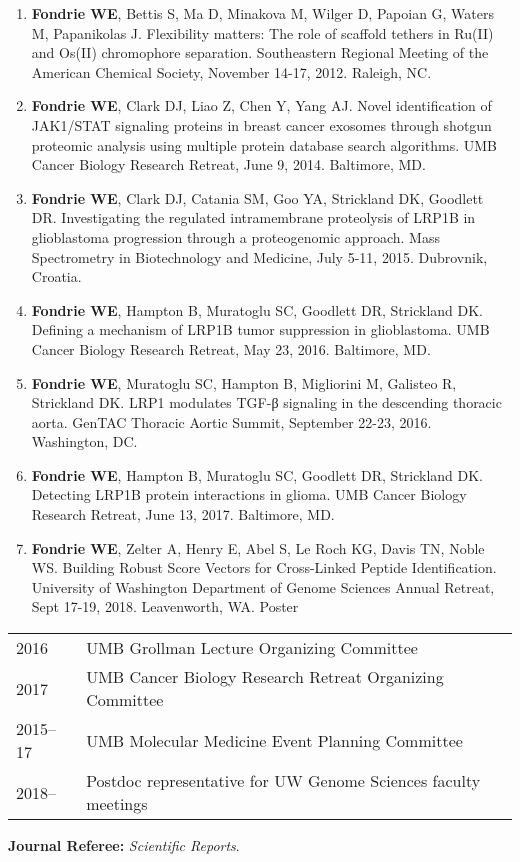 \documentclass{article}
\newcommand{\mysection}[1]{\vspace{1ex}{\bf #1}}
\begin{document}
\mysection{Poster Presentations}

\begin{enumerate}
  \item {\bf Fondrie WE}, Bettis S, Ma D, Minakova M, Wilger D, Papoian G, Waters M, Papanikolas J. Flexibility matters: The role of scaffold tethers in Ru(II) and Os(II) chromophore separation. Southeastern Regional Meeting of the American Chemical Society, November 14-17, 2012. Raleigh, NC.

  \item {\bf Fondrie WE}, Clark DJ, Liao Z, Chen Y, Yang AJ. Novel identification of JAK1/STAT signaling proteins in breast cancer exosomes through shotgun proteomic analysis using multiple protein database search algorithms. UMB Cancer Biology Research Retreat, June 9, 2014. Baltimore, MD.

  \item {\bf Fondrie WE}, Clark DJ, Catania SM, Goo YA, Strickland DK, Goodlett DR. Investigating the regulated intramembrane proteolysis of LRP1B in glioblastoma progression through a proteogenomic approach. Mass Spectrometry in Biotechnology and Medicine, July 5-11, 2015. Dubrovnik, Croatia.

  \item {\bf Fondrie WE}, Hampton B, Muratoglu SC, Goodlett DR, Strickland DK. Defining a mechanism of LRP1B tumor suppression in glioblastoma. UMB Cancer Biology Research Retreat, May 23, 2016. Baltimore, MD.

  \item {\bf Fondrie WE}, Muratoglu SC, Hampton B, Migliorini M, Galisteo R, Strickland DK. LRP1 modulates TGF-β signaling in the descending thoracic aorta. GenTAC Thoracic Aortic Summit, September 22-23, 2016. Washington, DC.

  \item {\bf Fondrie WE}, Hampton B, Muratoglu SC, Goodlett DR, Strickland DK. Detecting LRP1B protein interactions in glioma. UMB Cancer Biology Research Retreat, June 13, 2017. Baltimore, MD.

  \item {\bf Fondrie WE}, Zelter A, Henry E, Abel S, Le Roch KG, Davis TN, Noble WS. Building Robust Score Vectors for Cross-Linked Peptide Identification. University of Washington Department of Genome Sciences Annual Retreat, Sept 17-19, 2018. Leavenworth, WA. Poster
\end{enumerate}

\mysection{Professional Service}

\begin{tabular}{p{0.5in}p{5.75in}}
  2016       & UMB Grollman Lecture Organizing Committee \\
  2017       & UMB Cancer Biology Research Retreat Organizing Committee \\
  2015--17 & UMB Molecular Medicine Event Planning Committee \\
  2018--     & Postdoc representative for UW Genome Sciences faculty meetings\\ 
\end{tabular}

{\bf Journal Referee: }{\em Scientific Reports}.
\end{document}
